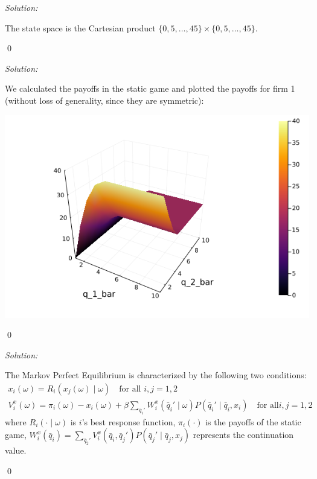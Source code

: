 \documentclass[12pt]{article}
\newenvironment{problem}[2][Problem]{\begin{trivlist}
\item[\hskip \labelsep {\bfseries #1}\hskip \labelsep {\bfseries #2.}]}{\end{trivlist}}
\newenvironment{sol}
    {\emph{Solution:}
    }
    {
    \qed
    }
\begin{document}
\begin{problem}{1}
\end{problem}
\begin{sol}
    The state space is the Cartesian product $\{0, 5, \ldots, 45\} \times \{0, 5, \ldots, 45\}$.
\end{sol}
\begin{problem}{2}
\end{problem}
\begin{sol}
    We calculated the payoffs in the static game and plotted the payoffs for firm 1 (without loss of generality, since they are symmetric):
    \begin{center}
        \includegraphics[scale=0.5]{piplot.png}
    \end{center}
\end{sol}
\begin{problem}{3}
\end{problem}
\begin{sol}
The Markov Perfect Equilibrium is characterized by the following two conditions:
\begin{align}
    x_i(\omega) = R_i(x_j(\omega)\mid \omega) \quad \text{for all } i,j = 1,2\\
    V_i^x(\omega) = \pi_i(\omega) - x_i(\omega) + \beta \sum_{\bar{q}_i'} W_i^x(\bar{q}_i'\mid \omega) P(\bar{q}_i' \mid \bar{q}_i, x_i) \quad \text{for all} i,j = 1,2
\end{align}
where $R_i(\cdot \mid \omega)$ is $i$'s best response function, $\pi_i(\cdot)$ is the payoffs of the static game, $W_i^x(\bar{q}_i) = \sum_{\bar{q}_2'} V_i^x(\bar{q}_i, \bar{q}_j') P(\bar{q}_j' \mid \bar{q}_j, x_j)$ represents the continuation value. 
\end{sol}
\end{document}
